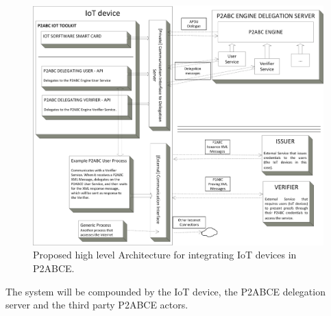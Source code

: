 \documentclass[journal]{IEEEtran}
\begin{document}
\begin{figure}[bth]
	\begin{center}
		\includegraphics[width=\linewidth]{gfx/P2ABCE-IoT-bw}
	\end{center}
	\caption{Proposed high level Architecture for integrating IoT devices in P2ABCE.}
	\label{fig:P2ABCE-IoT}
\end{figure}


\hfil


The system will be compounded by the IoT device, the P2ABCE delegation server and the third party P2ABCE actors.
\end{document}

